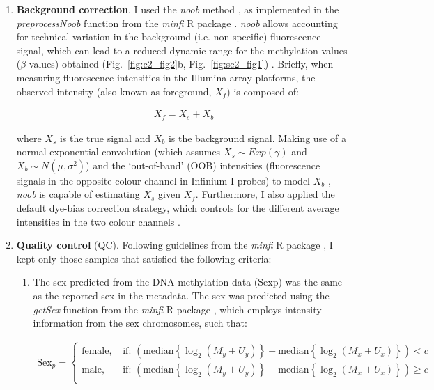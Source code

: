 \begin{enumerate}
	
	
	\item \textbf{Background correction}. I used the \textit{noob} method \cite{TricheJr2013}, as implemented in the \textit{preprocessNoob} function from the \textit{minfi} R package \cite{Aryee2014}. \textit{noob} allows accounting for technical variation in the background (i.e. non-specific) fluorescence signal, which can lead to a reduced dynamic range for the methylation values ($\beta$-values) obtained (Fig.~\ref{fig:c2_fig2}b, Fig.~\ref{fig:sc2_fig1}) \cite{TricheJr2013}. Briefly, when measuring fluorescence intensities in the Illumina array platforms, the observed intensity (also known as foreground, $X_f$) is composed of:
	
	\begin{align}
	X_f = X_s + X_b
	\end{align}
	
	where $X_s$ is the true signal and $X_b$ is the background signal. Making use of a normal-exponential convolution (which assumes $X_s\sim Exp(\gamma)$ and $X_b\sim N(\mu, \sigma^2)$) and the `out-of-band' (\acrshort{OOB}) intensities (fluorescence signals in the opposite colour channel in Infinium I probes) to model $X_b$ , \textit{noob} is capable of estimating $X_s$ given $X_f$. Furthermore, I also applied the default dye-bias correction strategy, which controls for the different average intensities in the two colour channels \cite{TricheJr2013}. 
	
		\item \textbf{Quality control} (QC). Following guidelines from the \textit{minfi} R package \cite{Aryee2014}, I kept only those samples that satisfied the following criteria:
		
		\begin{enumerate}
			
			\item The sex predicted from the DNA methylation data (\acrshort{Sexp}) was the same as the reported sex in the metadata. The sex was predicted  using the \textit{getSex} function from the \textit{minfi} R package \cite{Aryee2014}, which employs intensity information from the sex chromosomes, such that:
			
			\begin{align}
			\text{Sex}_{p} = 
			\begin{cases}
			\text{female, } &\text{if: } (\mathrm{median}\left\{\log_2(M_{y}+U_{y})\right\} -  \mathrm{median}\left\{\log_2(M_{x}+U_{x})\right\}) < c \\
			\text{male, } &\text{if: } (\mathrm{median}\left\{\log_2(M_{y}+U_{y})\right\} -  \mathrm{median}\left\{\log_2(M_{x}+U_{x})\right\}) \geq c \\
			\end{cases}
			\end{align}
			

\end{enumerate}
\end{enumerate}
